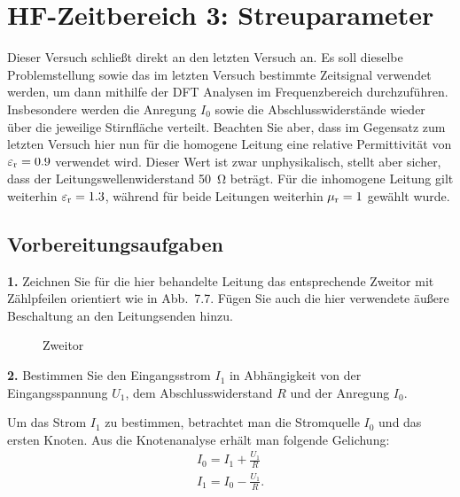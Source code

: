 \documentclass[Protokollheft.tex]{subfiles}
\begin{document}
\chapter{HF-Zeitbereich 3: Streuparameter}
Dieser Versuch schließt direkt an den letzten Versuch an. Es soll dieselbe
Problemstellung sowie das im letzten Versuch bestimmte Zeitsignal verwendet werden,
um dann mithilfe der DFT Analysen im Frequenzbereich durchzuführen. Insbesondere 
werden die Anregung $I_0$ sowie die Abschlusswiderstände wieder über die jeweilige 
Stirnfläche verteilt. Beachten Sie aber, dass im Gegensatz zum letzten Versuch hier nun
für die homogene Leitung eine relative Permittivität von $\varepsilon_{\text{r}}=0.9$ verwendet wird.
Dieser Wert ist zwar unphysikalisch, stellt aber sicher, dass der 
Leitungswellenwiderstand \SI{50}{\ohm} beträgt. Für die inhomogene Leitung gilt weiterhin
$\varepsilon_{\text{r}}=1.3$, während für beide Leitungen weiterhin $\mu_{\text{r}}=1$ gewählt wurde.

\section{Vorbereitungsaufgaben}

\begin{framed}
	\noindent \textbf{1.} Zeichnen Sie für die hier behandelte Leitung das entsprechende Zweitor mit Zählpfeilen orientiert wie in Abb.~7.7. Fügen Sie auch die hier verwendete äußere Beschaltung an den Leitungsenden hinzu.\label{exer:twoPort}
\end{framed}

\begin{figure}[h]
	\centering
	\def\svgwidth{0.8\textwidth}
	
	\caption{Zweitor}
	\label{fig:schal}
\end{figure}
\begin{framed}
	\noindent \textbf{2.} Bestimmen Sie den Eingangsstrom $I_1$ in Abhängigkeit von der Eingangsspannung $U_1$, dem Abschlusswiderstand $R$ und der Anregung $I_0$.\label{exer:calcI1}
\end{framed}

Um das Strom $I_1$ zu bestimmen, betrachtet man die Stromquelle $I_0$ und  das ersten Knoten. Aus die Knotenanalyse erhält man folgende Gelichung: 
\begin{eqnarray}
I_0  = I_1 + \frac{U_1}{R} \\
I_1 = I_0-\frac{U_1}{R}.
\end{eqnarray}
 
\end{document}
